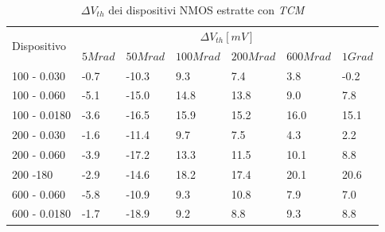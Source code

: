 \documentclass[
	a4paper,
	cleardoublepage=empty,
	headings=twolinechapter,
	numbers=autoenddot,
]{scrbook}
\begin{document}
\begin{table}[H]
  \renewcommand{\arraystretch}{1.3}
  \begin{tabular}{m{2.1cm}  m{1.1cm} m{1.3cm} m{1.5cm} m{1.5cm} m{1.5cm} m{1cm}}
    \toprule
    \multirow{2}{*}{Dispositivo} & \multicolumn{6}{c}{$\Delta V_{th} [mV] $}                                                          \\
    \cmidrule{2-7}
                                 & $5Mrad$                                   & $50Mrad$ & $100Mrad$ & $200Mrad$ & $600Mrad$ & $1Grad$ \\
    \midrule
    100 - 0.030                     & -0.7                                      & -10.3    & 9.3       & 7.4       & 3.8       & -0.2        \\
    \hline
    100 - 0.060                     & -5.1                                      & -15.0    & 14.8      & 13.8      & 9.0       & 7.8        \\
    \hline
    100 - 0.0180                    & -3.6                                      & -16.5    & 15.9      & 15.2      & 16.0      & 15.1        \\
    \hline
    200 - 0.030                     & -1.6                                      & -11.4    & 9.7       & 7.5       & 4.3       & 2.2        \\
    \hline
    200 - 0.060                     & -3.9                                      & -17.2    & 13.3      & 11.5      & 10.1      & 8.8        \\
    \hline
    200 -180                     & -2.9                                      & -14.6    & 18.2      & 17.4      & 20.1      & 20.6        \\
    \hline
    600 - 0.060                     & -5.8                                      & -10.9    & 9.3       & 10.8      & 7.9       & 7.0        \\
    \hline
    600 - 0.0180                    & -1.7                                      & -18.9    & 9.2       & 8.8       & 9.3       & 8.8        \\
    \bottomrule
  \end{tabular}
  \caption{$\Delta V_{th}$ dei dispositivi NMOS estratte con \emph{TCM}}
  \label{tab:deltaVthTCMN}
\end{table}
\end{document}
